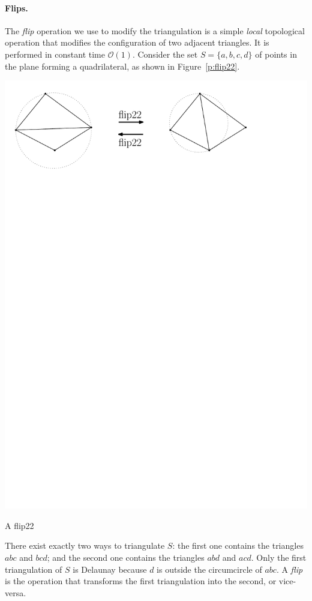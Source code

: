 \paragraph{Flips.}The \emph{flip} operation we use to modify the triangulation is a simple \emph{local} topological operation that modifies the configuration of two adjacent triangles. 
It is performed in constant time $\mathcal{O}(1)$.
Consider the set $S = \{a, b, c, d\}$ of points in the plane forming a quadrilateral, as shown in Figure~\ref{p:flip22}. 
\begin{marginfigure}
  \includegraphics[width=\textwidth]{figs/flip22}
  \caption{A flip22}%
\label{p:flip22}
\end{marginfigure}
There exist exactly two ways to triangulate $S$: the first one contains the triangles $abc$ and $bcd$; and the second one contains the triangles $abd$ and $acd$. 
Only the first triangulation of $S$ is Delaunay because $d$ is outside the circumcircle of $abc$. 
A \emph{flip} is the operation that transforms the first triangulation into the second, or vice-versa.


